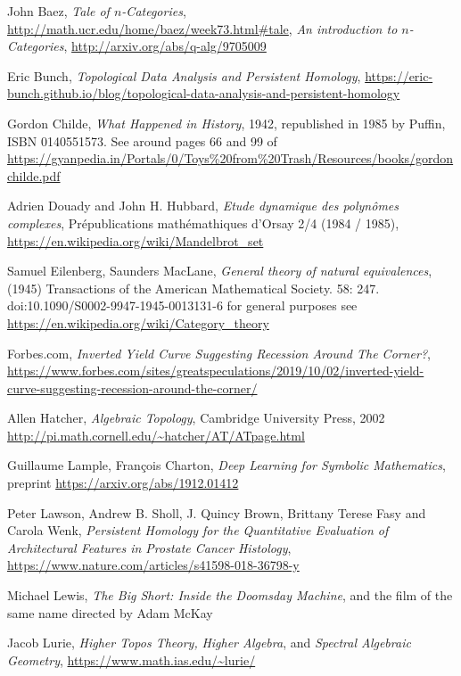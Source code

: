 \documentclass{article}
\begin{document}
\begin{thebibliography}{99}

 John Baez, \textit{Tale of $n$-Categories}, \url{http://math.ucr.edu/home/baez/week73.html#tale}, \textit{An introduction to $n$-Categories}, \url{http://arxiv.org/abs/q-alg/9705009}

 Eric Bunch, \textit{Topological Data Analysis and Persistent Homology}, \url{https://eric-bunch.github.io/blog/topological-data-analysis-and-persistent-homology}

 Gordon Childe, \textit{What Happened in History}, 1942, republished in 1985 by Puffin, ISBN 0140551573. See around pages 66 and 99 of \url{https://gyanpedia.in/Portals/0/Toys%20from%20Trash/Resources/books/gordonchilde.pdf}

 Adrien Douady and John H. Hubbard, \textit{Etude dynamique des polyn\^omes complexes}, Pr\'epublications math\'emathiques d'Orsay 2/4 (1984 / 1985), \url{https://en.wikipedia.org/wiki/Mandelbrot_set}

 Samuel Eilenberg, Saunders MacLane, \textit{General theory of natural equivalences}, (1945) Transactions of the American Mathematical Society. 58: 247. doi:10.1090/S0002-9947-1945-0013131-6 for general purposes see \url{https://en.wikipedia.org/wiki/Category_theory}

 Forbes.com, \textit{Inverted Yield Curve Suggesting Recession Around The Corner?}, \url{https://www.forbes.com/sites/greatspeculations/2019/10/02/inverted-yield-curve-suggesting-recession-around-the-corner/}

 Allen Hatcher, \textit{Algebraic Topology}, Cambridge University Press, 2002 \url{http://pi.math.cornell.edu/~hatcher/AT/ATpage.html}

 Guillaume Lample, Fran\c cois Charton, \textit{Deep Learning for Symbolic Mathematics}, preprint \url{https://arxiv.org/abs/1912.01412}

 Peter Lawson, Andrew B. Sholl, J. Quincy Brown, Brittany Terese Fasy and Carola Wenk, \textit{Persistent Homology for the Quantitative Evaluation of Architectural Features in Prostate Cancer Histology}, \url{https://www.nature.com/articles/s41598-018-36798-y}

 Michael Lewis, \textit{The Big Short: Inside the Doomsday Machine}, and the film of the same name directed by Adam McKay

 Jacob Lurie, \textit{Higher Topos Theory,} \textit{Higher Algebra}, and \textit{Spectral Algebraic Geometry}, \url{https://www.math.ias.edu/~lurie/}



\end{thebibliography}
\end{document}
